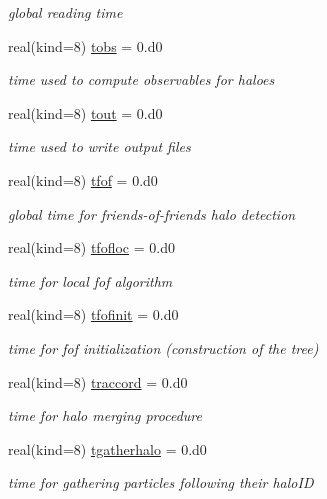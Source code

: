 \begin{DoxyCompactItemize}
\begin{DoxyCompactList}\small\item\em global reading time \end{DoxyCompactList}\item 
real(kind=8) \hyperlink{namespacemodtiming_a83f5f02456356934410977b127c6308c}{tobs} = 0.d0
\begin{DoxyCompactList}\small\item\em time used to compute observables for haloes \end{DoxyCompactList}\item 
real(kind=8) \hyperlink{namespacemodtiming_aad2ce715be55a32442a507f77e24f096}{tout} = 0.d0
\begin{DoxyCompactList}\small\item\em time used to write output files \end{DoxyCompactList}\item 
real(kind=8) \hyperlink{namespacemodtiming_ac6dbf200ea4d6d6248bb9df21ed8d2a7}{tfof} = 0.d0
\begin{DoxyCompactList}\small\item\em global time for friends-\/of-\/friends halo detection \end{DoxyCompactList}\item 
real(kind=8) \hyperlink{namespacemodtiming_a2574a405aaa97058f43e1e6b0b1d96e1}{tfofloc} = 0.d0
\begin{DoxyCompactList}\small\item\em time for local fof algorithm \end{DoxyCompactList}\item 
real(kind=8) \hyperlink{namespacemodtiming_a2c5b98c383953b670ee94c1022c2d822}{tfofinit} = 0.d0
\begin{DoxyCompactList}\small\item\em time for fof initialization (construction of the tree) \end{DoxyCompactList}\item 
real(kind=8) \hyperlink{namespacemodtiming_a9b8eac461e18e3b6c057420bae5b004e}{traccord} = 0.d0
\begin{DoxyCompactList}\small\item\em time for halo merging procedure \end{DoxyCompactList}\item 
real(kind=8) \hyperlink{namespacemodtiming_a6a20740b33d07d1c6b9ed51953b48b0d}{tgatherhalo} = 0.d0
\begin{DoxyCompactList}\small\item\em time for gathering particles following their halo\+ID \end{DoxyCompactList}\item 

\end{DoxyCompactItemize}
